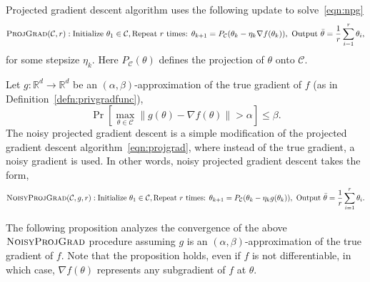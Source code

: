 \documentclass{article}
\theoremstyle{plain}
\def \NoisyProjGrad {\textsc{NoisyProjGrad}\xspace}
\def \ProjGrad {\textsc{ProjGrad}\xspace}
\def \CCC {\mathcal{C}}
\def \R {\mathbb{R}}
\begin{document}
Projected gradient descent algorithm uses the following update to solve~\eqref{eqn:npg}
\begin{align} \label{eqn:projgrad} 
\ProjGrad(\CCC,r): \mbox{Initialize } \theta_1 \in \CCC, \mbox{Repeat $r$ times: }  
\theta_{k+1} = P_{\CCC}(\theta_k - \eta_k \nabla f(\theta_k)), \mbox{ Output }  \bar{\theta} =  \frac{1}{r}\sum_{i=1}^{r} \theta_i, 
\end{align}
for some stepsize $\eta_k$. Here $P_{\CCC}(\theta)$ defines the projection of $\theta$ onto $\CCC$. 

Let $g : \R^d \rightarrow \R^d$ be an $(\alpha,\beta)$-approximation of the true gradient of $f$ (as in Definition~\ref{defn:privgradfunc}),  
$$\Pr\left[\max_{\theta \in \CCC}\| g(\theta) - \nabla f(\theta)  \| > \alpha\right]\leq\beta.$$
The noisy projected gradient descent is a simple modification of the projected gradient descent algorithm~\eqref{eqn:projgrad}, where instead of the true gradient, a noisy gradient is used. In other words, noisy projected gradient descent takes the form,
\begin{align}
\NoisyProjGrad(\CCC,g,r): \mbox{Initialize } \theta_1 \in \CCC, \mbox{Repeat $r$ times: } 
\theta_{k+1} = P_{\CCC}(\theta_k - \eta_k g(\theta_k)), \mbox{ Output }  \bar{\theta} = \frac{1}{r}\sum_{i=1}^{r} \theta_i.
\end{align}

The following proposition analyzes the convergence of the above $\NoisyProjGrad$ procedure assuming $g$ is an $(\alpha,\beta)$-approximation of the true gradient of $f$. Note that the proposition holds, even if $f$ is not differentiable, in which case, $\nabla f(\theta)$ represents any subgradient of $f$ at $\theta$.
\end{document}
